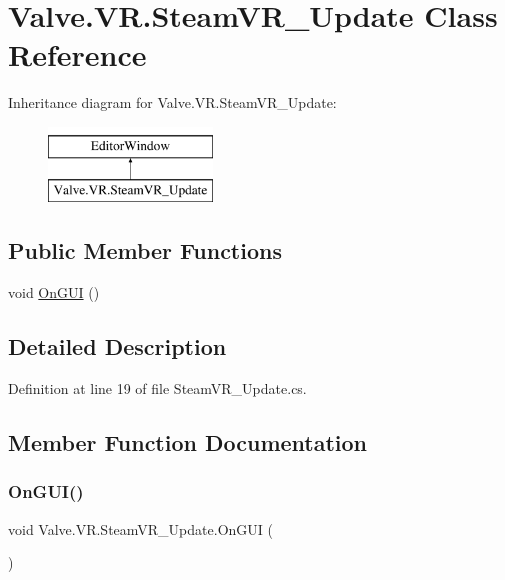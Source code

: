 \hypertarget{class_valve_1_1_v_r_1_1_steam_v_r___update}{}\section{Valve.\+V\+R.\+Steam\+V\+R\+\_\+\+Update Class Reference}
\label{class_valve_1_1_v_r_1_1_steam_v_r___update}
Inheritance diagram for Valve.\+V\+R.\+Steam\+V\+R\+\_\+\+Update\+:\begin{figure}[H]
\begin{center}
\leavevmode
\includegraphics[height=2.000000cm]{class_valve_1_1_v_r_1_1_steam_v_r___update}
\end{center}
\end{figure}
\subsection*{Public Member Functions}
\begin{DoxyCompactItemize}
\item 
void \mbox{\hyperlink{class_valve_1_1_v_r_1_1_steam_v_r___update_a0d42a40d707c0ff98bf35034e3b86dee}{On\+G\+UI}} ()
\end{DoxyCompactItemize}


\subsection{Detailed Description}


Definition at line 19 of file Steam\+V\+R\+\_\+\+Update.\+cs.



\subsection{Member Function Documentation}
\mbox{\label{class_valve_1_1_v_r_1_1_steam_v_r___update_a0d42a40d707c0ff98bf35034e3b86dee}} 
\subsubsection{\texorpdfstring{OnGUI()}{OnGUI()}}
{\footnotesize\ttfamily void Valve.\+V\+R.\+Steam\+V\+R\+\_\+\+Update.\+On\+G\+UI (\begin{DoxyParamCaption}{ }\end{DoxyParamCaption})}



